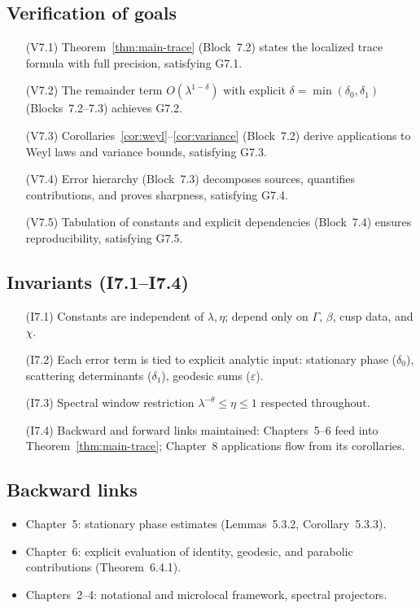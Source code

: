 \subsection*{Verification of goals}

\begin{itemize}
  \item[(V7.1)] Theorem~\ref{thm:main-trace} (Block~7.2) states the localized trace formula with full precision, satisfying G7.1.
  \item[(V7.2)] The remainder term $O(\lambda^{1-\delta})$ with explicit $\delta=\min(\delta_0,\delta_1)$ (Blocks~7.2–7.3) achieves G7.2.
  \item[(V7.3)] Corollaries~\ref{cor:weyl}–\ref{cor:variance} (Block~7.2) derive applications to Weyl laws and variance bounds, satisfying G7.3.
  \item[(V7.4)] Error hierarchy (Block~7.3) decomposes sources, quantifies contributions, and proves sharpness, satisfying G7.4.
  \item[(V7.5)] Tabulation of constants and explicit dependencies (Block~7.4) ensures reproducibility, satisfying G7.5.
\end{itemize}

\subsection*{Invariants (I7.1–I7.4)}

\begin{itemize}
  \item[(I7.1)] Constants are independent of $\lambda,\eta$; depend only on $\Gamma$, $\beta$, cusp data, and $\chi$.
  \item[(I7.2)] Each error term is tied to explicit analytic input: stationary phase ($\delta_0$), scattering determinants ($\delta_1$), geodesic sums ($\varepsilon$).
  \item[(I7.3)] Spectral window restriction $\lambda^{-\theta}\leq\eta\leq 1$ respected throughout.
  \item[(I7.4)] Backward and forward links maintained: Chapters~5–6 feed into Theorem~\ref{thm:main-trace}; Chapter~8 applications flow from its corollaries.
\end{itemize}

\subsection*{Backward links}

\begin{itemize}
  \item Chapter~5: stationary phase estimates (Lemmas~5.3.2, Corollary~5.3.3).
  \item Chapter~6: explicit evaluation of identity, geodesic, and parabolic contributions (Theorem~6.4.1).
  \item Chapters~2–4: notational and microlocal framework, spectral projectors.
\end{itemize}


